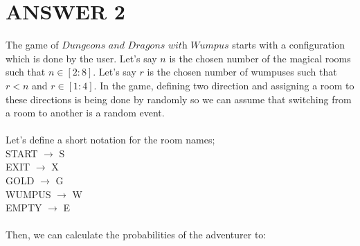 \documentclass[12pt]{article}
\begin{document}
\section*{ANSWER 2}
The game of $\textit{Dungeons and Dragons with Wumpus}$ starts with a configuration which is done by the user.
Let's say $n$ is the chosen number of the magical rooms such that $n \in [2:8]$.
Let's say $r$ is the chosen number of wumpuses such that $r<n$ and $r\in [1:4]$. In the game, defining two direction and assigning a room to these directions is being done by randomly so we can assume that switching from a room to another is a random event.\\
\\Let's define a short notation for the room names;\\
\hspace*{1cm}START   $\rightarrow$ S\\
\hspace*{1cm}EXIT    $\rightarrow$ X\\
\hspace*{1cm}GOLD    $\rightarrow$ G\\
\hspace*{1cm}WUMPUS  $\rightarrow$ W\\
\hspace*{1cm}EMPTY   $\rightarrow$ E\\
\\
Then, we can calculate the probabilities of the adventurer to:
\end{document}
